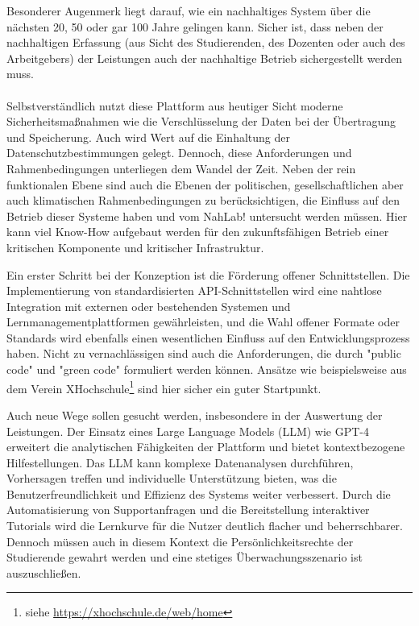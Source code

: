 \documentclass[conference]{IEEEtran}
\begin{document}
Besonderer Augenmerk liegt darauf, wie ein nachhaltiges System über die nächsten 20, 50 oder gar 100 Jahre gelingen kann. Sicher ist, dass neben der nachhaltigen Erfassung (aus Sicht des Studierenden, des Dozenten oder auch des Arbeitgebers) der Leistungen auch der nachhaltige Betrieb sichergestellt werden muss. 
\\\\
Selbstverständlich nutzt diese Plattform aus heutiger Sicht moderne Sicherheitsmaßnahmen wie die Verschlüsselung der Daten bei der Übertragung und Speicherung. Auch wird Wert auf die Einhaltung der Datenschutzbestimmungen gelegt. Dennoch, diese Anforderungen und Rahmenbedingungen unterliegen dem Wandel der Zeit. Neben der rein funktionalen Ebene sind auch die Ebenen der politischen, gesellschaftlichen aber auch klimatischen Rahmenbedingungen zu berücksichtigen, die Einfluss auf den Betrieb dieser Systeme haben und vom NahLab! untersucht werden müssen. Hier kann viel Know-How aufgebaut werden für den zukunftsfähigen Betrieb einer kritischen Komponente und kritischer Infrastruktur.

Ein erster Schritt bei der Konzeption ist die Förderung offener Schnittstellen. Die Implementierung von standardisierten API-Schnittstellen wird eine nahtlose Integration mit externen oder bestehenden Systemen und Lernmanagementplattformen gewährleisten, und die Wahl offener Formate oder Standards wird ebenfalls einen wesentlichen Einfluss auf den Entwicklungsprozess haben. Nicht zu vernachlässigen sind auch die Anforderungen, die durch "public code" und "green code" formuliert werden können. Ansätze wie beispielsweise aus dem Verein XHochschule\footnote{siehe \href{https://xhochschule.de/web/home}{https://xhochschule.de/web/home}} sind hier sicher ein guter Startpunkt.

Auch neue Wege sollen gesucht werden, insbesondere in der Auswertung der Leistungen. Der Einsatz eines Large Language Models (LLM) wie GPT-4 erweitert die analytischen Fähigkeiten der Plattform und bietet kontextbezogene Hilfestellungen. Das LLM kann komplexe Datenanalysen durchführen, Vorhersagen treffen und individuelle Unterstützung bieten, was die Benutzerfreundlichkeit und Effizienz des Systems weiter verbessert. Durch die Automatisierung von Supportanfragen und die Bereitstellung interaktiver Tutorials wird die Lernkurve für die Nutzer deutlich flacher und beherrschbarer. Dennoch müssen auch in diesem Kontext die Persönlichkeitsrechte der Studierende gewahrt werden und eine stetiges Überwachungsszenario ist auszuschließen. 
\end{document}
